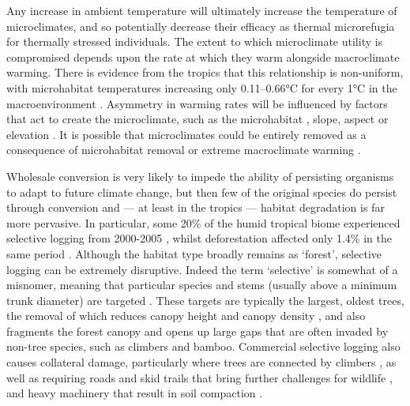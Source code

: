 \documentclass[12pt,a4paper,]{report}
\theoremstyle{definition}
\theoremstyle{definition}
\theoremstyle{definition}
\theoremstyle{remark}
\begin{document}
Any increase in ambient temperature will ultimately increase the
temperature of microclimates, and so potentially decrease their efficacy
as thermal microrefugia for thermally stressed individuals. The extent
to which microclimate utility is compromised depends upon the rate at
which they warm alongside macroclimate warming. There is evidence from
the tropics that this relationship is non-uniform, with microhabitat
temperatures increasing only 0.11--0.66°C for every 1°C in the
macroenvironment \citep{scheffers_microhabitats_2014}. Asymmetry in
warming rates will be influenced by factors that act to create the
microclimate, such as the microhabitat
\citep{scheffers_microhabitats_2014}, slope, aspect or elevation
\citep{suggitt_habitat_2011}. It is possible that microclimates could be
entirely removed as a consequence of microhabitat removal
\citep[e.g.~loss of some bird's nest fern species upon conversion of
forest to oil palm plantation;][]{fayle_effect_2009} or extreme
macroclimate warming \citep{caillon_warming_2014}.

Wholesale conversion is very likely to impede the ability of persisting
organisms to adapt to future climate change, but then few of the
original species do persist through conversion
\citep[e.g.][]{gibson_primary_2011, katovai_understory_2012, murphy_meta-analysis_2014}
and --- at least in the tropics --- habitat degradation is far more
pervasive. In particular, some 20\% of the humid tropical biome
experienced selective logging from 2000-2005
\citep{asner_contemporary_2009}, whilst deforestation affected only
1.4\% in the same period \citep{hansen_humid_2008}. Although the habitat
type broadly remains as `forest', selective logging can be extremely
disruptive. Indeed the term `selective' is somewhat of a misnomer,
meaning that particular species and stems (usually above a minimum trunk
diameter) are targeted \citep{edwards_maintaining_2014}. These targets
are typically the largest, oldest trees, the removal of which reduces
canopy height and canopy density
\citep{kumar_effects_2005, okuda_effect_2003}, and also fragments the
forest canopy and opens up large gaps \citep{edwards_maintaining_2014}
that are often invaded by non-tree species, such as climbers and bamboo.
Commercial selective logging also causes collateral damage, particularly
where trees are connected by climbers
\citep{schnitzer_recruitment_2004}, as well as requiring roads and skid
trails that bring further challenges for wildlife
\citep{brodie_correlation_2014, laurance_global_2014}, and heavy
machinery that result in soil compaction
\citep{putz_reduced-impact_2008}.
\end{document}
